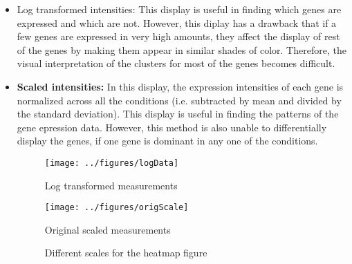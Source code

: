 \documentclass[12pt, oneside, letterpaper]{article}
\begin{document}





\begin{itemize}

\item {Log transformed intensities:} 
	This display is useful in finding which genes are expressed
	and which are not. However, this diplay has a drawback that
	if a few genes are expressed in very high amounts, they
	affect the display of rest of the genes by making them
	appear in similar shades of color.  Therefore, the visual
	interpretation of the clusters for most of the genes becomes
	difficult.

\item \textbf{Scaled intensities:} 
	In this display, the expression intensities of each gene is
	normalized across all the conditions (i.e. subtracted by
	mean and divided by the standard deviation). This display is
	useful in finding the patterns of the gene epression
	data. However, this method is also unable to differentially
	display the genes, if one gene is dominant in any one of the
	conditions.

\begin{figure*}[p]

\begin{minipage}[t]{2.5in}
\begin{center}
\texttt{[image: ../figures/logData]}
\caption{Log transformed measurements}
\label{Log transformed measurements}
\end{center}
\end{minipage}
\hfill
\begin{minipage}[t]{2.5in}
\begin{center}
\texttt{[image: ../figures/origScale]}
\caption{Original scaled measurements}
\label{Original scaled measurements}
\end{center}
\end{minipage}

\caption{Different scales for the heatmap figure}
\end{figure*}




\end{itemize}
\end{document}
